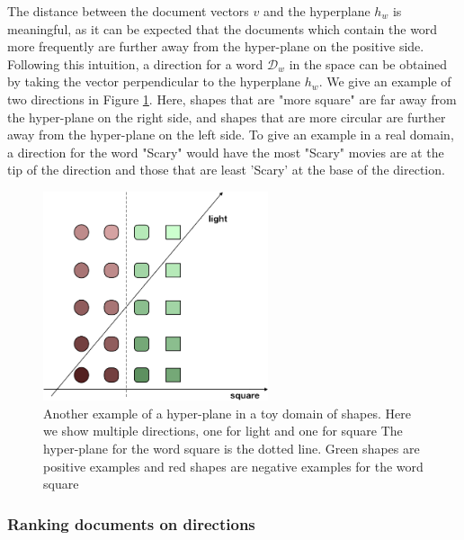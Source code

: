 The distance between the document vectors $v$ and the hyperplane $h_w$ is  meaningful, as it can be expected that the documents which contain the word more frequently are  further away from the hyper-plane on the positive side. Following this intuition, a direction for a word $\mathcal{D}_w$ in the space can be obtained by taking the vector perpendicular to the hyperplane $h_w $. We give an example of two directions in Figure \ref{ch3:ToyHyperPlane}. Here, shapes that are "more square" are far away from the hyper-plane on the right side, and  shapes that are more circular are further away from the hyper-plane on the left side. To  give an example in a real domain, a direction for the word "Scary" would have the most "Scary" movies are at the tip of the direction and those that are least 'Scary'  at the base of the direction. %
\begin{figure}[t]
	\includegraphics[width=250px]{images/ToyHyperplane.png}
	\centering
	\caption{Another example of a hyper-plane in a toy domain of shapes. Here we show multiple directions, one for light and one for square The hyper-plane for the word square is the dotted line. Green shapes are positive examples and red shapes are negative examples for the word square}\label{ch3:ToyHyperPlane}
\end{figure}

\subsubsection{Ranking documents on directions}\label{ch3:rankingdocuments}

